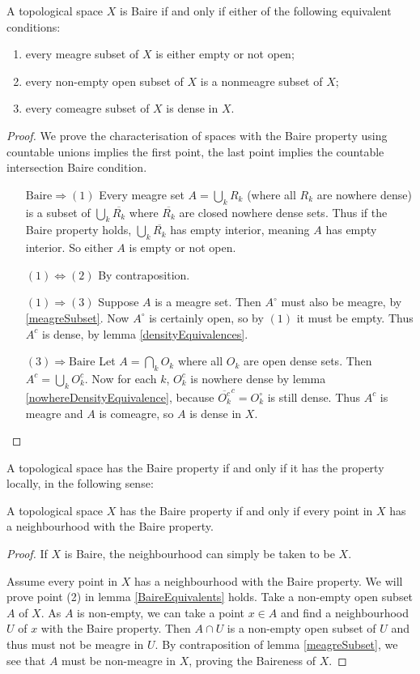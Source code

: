 \begin{lemma} \label{BaireEquivalents}
A topological space $X$ is Baire \textup{if and only if} either of the following equivalent conditions:
\begin{enumerate}
\item every meagre subset of $X$ is either empty or not open;
\item every non-empty open subset of $X$ is a nonmeagre subset of $X$;
\item every comeagre subset of $X$ is dense in $X$.
\end{enumerate}
\end{lemma}
\begin{proof}
We prove the characterisation of spaces with the Baire property using countable unions implies the first point, the last point implies the countable intersection Baire condition.
\begin{itemize}[leftmargin=3cm]
\item[$\boxed{\text{Baire}\Rightarrow (1)}$] Every meagre set $A = \bigcup_k R_k$ (where all $R_k$ are nowhere dense) is a subset of $\bigcup_k \overline{R_k}$ where $\overline{R_k}$ are closed nowhere dense sets. Thus if the Baire property holds, $\bigcup_k \overline{R_k}$ has empty interior, meaning $A$ has empty interior. So either $A$ is empty or not open.
\item[$\boxed{(1) \Leftrightarrow (2)}$] By contraposition.
\item[$\boxed{(1) \Rightarrow (3)}$] Suppose $A$ is a meagre set. Then $A^\circ$ must also be meagre, by \ref{meagreSubset}. Now $A^\circ$ is certainly open, so by $(1)$ it must be empty. Thus $A^c$ is dense, by lemma \ref{densityEquivalences}.
\item[$\boxed{(3) \Rightarrow \text{Baire}}$] Let $A = \bigcap_k O_k$ where all $O_k$ are open dense sets. Then $A^c = \bigcup_k O_k^c$. Now for each $k$, $O_k^c$ is nowhere dense by lemma \ref{nowhereDensityEquivalence}, because $\overline{O_k^c}^c = O_k^\circ$ is still dense. Thus $A^c$ is meagre and $A$ is comeagre, so $A$ is dense in $X$.
\end{itemize}
\end{proof}

A topological space has the Baire property if and only if it has the property locally, in the following sense:
\begin{lemma}
A topological space $X$ has the Baire property \textup{if and only if} every point in $X$ has a neighbourhood with the Baire property.
\end{lemma}
\begin{proof}
If $X$ is Baire, the neighbourhood can simply be taken to be $X$.

Assume every point in $X$ has a neighbourhood with the Baire property.
We will prove point (2) in lemma \ref{BaireEquivalents} holds.
Take a non-empty open subset $A$ of $X$.
As $A$ is non-empty, we can take a point $x\in A$ and find a neighbourhood $U$ of $x$ with the Baire property.
Then $A\cap U$ is a non-empty open subset of $U$ and thus must not be meagre in $U$.
By contraposition of lemma \ref{meagreSubset}, we see that $A$ must be non-meagre in $X$, proving the Baireness of $X$.
\end{proof}


